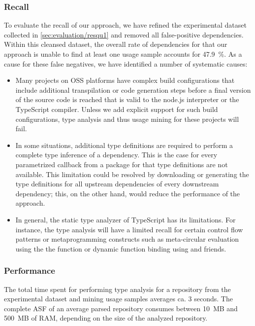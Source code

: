 \subsubsection{Recall}
\label{sec:evaluation/resqu2/recall}

To evaluate the recall of our approach, we have refined the experimental dataset collected in \cref{sec:evaluation/resqu1} and removed all false-positive dependencies.
Within this cleansed dataset, the overall rate of dependencies for that our approach is unable to find at least one usage sample accounts for \SI{47.9}{\percent}.
As a cause for these false negatives, we have identified a number of systematic causes:

\begin{itemize}
	\item Many projects on OSS platforms have complex build configurations that include additional transpilation or code generation steps before a final version of the source code is reached that is valid to the node.js interpreter or the TypeScript compiler.
		Unless we add explicit support for such build configurations, type analysis and thus usage mining for these projects will fail.
	\item In some situations, additional type definitions are required to perform a complete type inference of a dependency.
		This is the case for every parametrized callback from a package for that type definitions are not available.
		This limitation could be resolved by downloading or generating the type definitions for all upstream dependencies of every downstream dependency; this, on the other hand, would reduce the performance of the approach.
	\item In general, the static type analyzer of TypeScript has its limitations.
		For instance, the type analysis will have a limited recall for certain control flow patterns or metaprogramming constructs such as meta-circular evaluation using the the  function or dynamic function binding using  and friends.
\end{itemize}

\subsubsection{Performance}
\label{sec:evaluation/resqu2/performance}

The total time spent for performing type analysis for a repository from the experimental dataset and mining usage samples averages ca. \num{3} seconds.
The complete ASF of an average parsed repository consumes between \SI{10}{MB} and \SI{500}{MB} of RAM, depending on the size of the analyzed repository.

